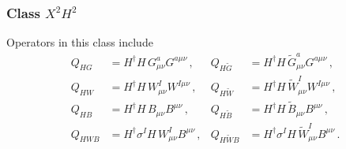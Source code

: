 \subsubsection{Class $X^2 H^2$}
%
Operators in this class include
\begin{align}
Q_{HG} &= H^\dagger H \, G_{\mu\nu}^a G^{a\mu\nu}\,, & Q_{H\tilde{G}}&= H^\dagger H\,\tilde{G}_{\mu\nu}^aG^{a\mu\nu}\,, \\
Q_{HW} &= H^\dagger H \, W_{\mu\nu}^I W^{I\mu\nu}\,, &Q_{H\tilde{W}}&= H^\dagger H\,\tilde{W}_{\mu\nu}^I W^{I\mu\nu}\,,  \\
Q_{HB} &= H^\dagger H \, B_{\mu\nu}B^{\mu\nu}\,, &Q_{H\tilde{B}}&= H^\dagger H\,\tilde{B}_{\mu\nu}B^{\mu\nu} \,,\\
Q_{HWB} &= H^\dagger \sigma^I H \, W_{\mu\nu}^I B^{\mu\nu}\,, & Q_{H\tilde W B}&= H^\dagger\sigma^I  H\,\tilde{W}_{\mu\nu}^I B^{\mu\nu} \,.
\end{align}

